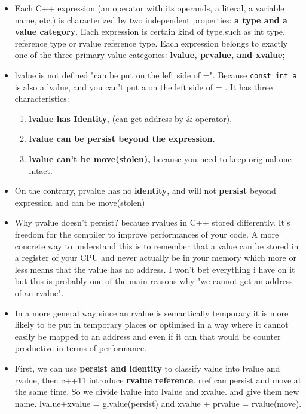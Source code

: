 \documentclass[a4paper,11pt,twoside]{book}
\begin{document}
\begin{itemize}
	\item Each C++ expression (an operator with its operands, a literal, a variable name, etc.) is characterized by two independent properties: \textbf{a type and a value category}. Each expression is certain kind of type,such as int type, reference type or rvalue reference type. Each expression belongs to exactly one of the three primary value categories: \textbf{lvalue, prvalue, and xvalue;} 
	
	\item lvalue is not defined "can be put on the left side of =". Because \texttt{const int a} is also a lvalue, and you can't put a on the left side of = . It has three characteristics:
	\begin{enumerate}
		\item\textbf{lvalue has Identity}, (can get address by \& operator),
		\item \textbf{lvalue can be persist beyond the expression. }
		\item \textbf{lvalue can't be move(stolen),} because you need to keep original one intact.
	\end{enumerate}
	
	\item On the contrary, prvalue has no \textbf{identity}, and will not \textbf{persist} beyond expression and can be move(stolen)
	
	\item Why pvalue doesn't persist? because rvalues in C++ stored differently. It's freedom for the compiler to improve performances of your code. A more concrete way to understand this is to remember that a value can be stored in a register of your CPU and never actually be in your memory which more or less means that the value has no address. I won't bet everything i have on it but this is probably one of the main reasons why "we cannot get an address of an rvalue".
	
	\item In a more general way since an rvalue is semantically temporary it is more likely to be put in temporary places or optimised in a way where it cannot easily be mapped to an address and even if it can that would be counter productive in terms of performance.
	
	\item First, we can use \textbf{persist and identity} to classify value into lvalue and rvalue, then c++11 introduce \textbf{rvalue reference}. rref can persist and move at the same time.  So we divide lvalue into lvalue and xvalue.  and give them new name.  lvalue+xvalue = glvalue(persist)  and xvalue + prvalue = rvalue(move).
	

\end{itemize}
\end{document}
